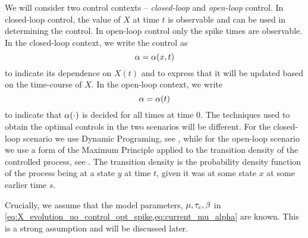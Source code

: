 We will consider two control contexts -- {\sl closed-loop} and  {\sl open-loop}
control. In closed-loop control, the value of $X$ at time $t$ is observable and
can be used in determining the control. In open-loop control only the spike
times are observable. In the closed-loop context, we write the control as $$\alpha =
\alpha(x,t)$$ to indicate its dependence on $X(t)$ and to express that it will be
updated based on the time-course of $X$. In the open-loop context, we write $$\alpha
= \alpha(t)$$ to indicate that $\alpha(\cdot)$ is decided for all times at time 0. The
techniques used to obtain the optimal controls in the two scenarios will be
different. For the closed-loop scenario we use Dynamic Programing, see
\cite{Fleming1975}, while for the open-loop scenario we use a form of the
Maximum Principle applied to the transition density of the controlled process,
see \cite{Borzi2012}. The transition density is the probability density function
of the process being at a state $y$ at time $t$, given it was at some state $x$
at some earlier time $s$.

Crucially, we assume that the model parameters, ${\mu },\tau_c,\beta$ in
\cref{eq:X_evolution_uo_control_opt_spike,eq:current_mu_alpha} are known. This is a strong assumption and will be
discussed later. 

